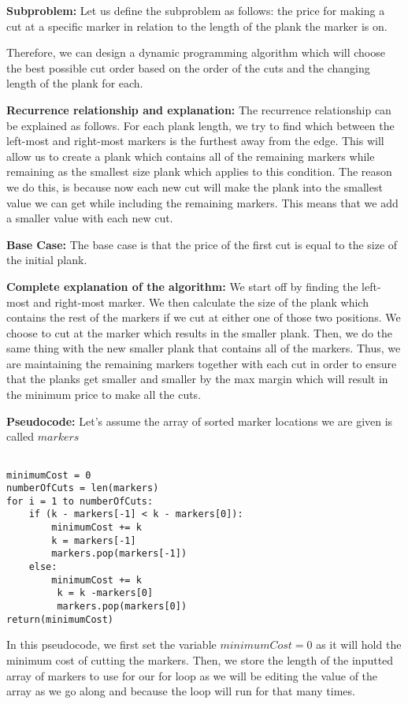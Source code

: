 \documentclass[letterpaper,11pt]{article}
\newcounter{problemid}\stepcounter{problemid}
\def\newproblem{\vspace*{0.5cm}{\bf Problem~\arabic{problemid}\stepcounter{problemid}}\hfill\fbox{\parbox{0.16\textwidth}{\bf Points:}}\par}
\begin{document}
\newproblem{}
{\bf Subproblem: } Let us define the subproblem as follows: the price for making a cut at a specific marker in relation to the length of the plank the marker is on. 

Therefore, we can design a dynamic programming algorithm which will choose the best possible cut order based on the order of the cuts and the changing length of the plank for each.

{\bf Recurrence relationship and explanation: } The recurrence relationship can be explained as follows. For each plank length, we try to find which between the left-most and right-most markers is the furthest away from the edge. This will allow us to create a plank which contains all of the remaining markers while remaining as the smallest size plank which applies to this condition. The reason we do this, is because now each new cut will make the plank into the smallest value we can get while including the remaining markers. This means that we add a smaller value with each new cut.

{\bf Base Case: } The base case is that the price of the first cut is equal to the size of the initial plank. 

{\bf Complete explanation of the algorithm: } We start off by finding the left-most and right-most marker. We then calculate the size of the plank which contains the rest of the markers if we cut at either one of those two positions. We choose to cut at the marker which results in the smaller plank. Then, we do the same thing with the new smaller plank that contains all of the markers. Thus, we are maintaining the remaining markers together with each cut in order to ensure that the planks get smaller and smaller by the max margin which will result in the minimum price to make all the cuts.

{\bf Pseudocode: } Let's assume the array of sorted marker locations we are given is called $markers$

\begin{Verbatim}[commandchars=\\\{\},codes={\catcode`$=3\catcode`_=8}]

minimumCost = 0
numberOfCuts = len(markers)
for i = 1 to numberOfCuts:
    if (k - markers[-1] < k - markers[0]):
        minimumCost += k
        k = markers[-1]
        markers.pop(markers[-1])
    else:
        minimumCost += k 
         k = k -markers[0]
         markers.pop(markers[0])
return(minimumCost)        
\end{Verbatim}
In this pseudocode, we first set the variable $minimumCost = 0$ as it will hold the minimum cost of cutting the markers. Then, we store the length of the inputted array of markers to use for our for loop as we will be editing the value of the array as we go along and because the loop will run for that many times.
\end{document}
